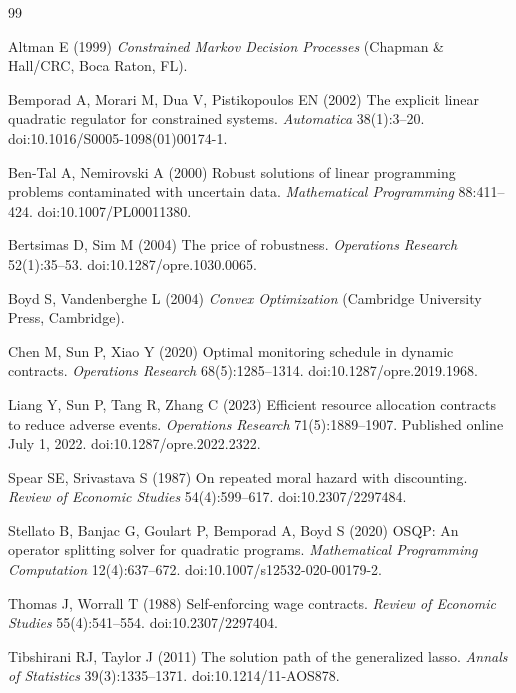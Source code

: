 \begin{thebibliography}{99}\raggedright
{}
Altman E (1999) \emph{Constrained Markov Decision Processes} (Chapman \& Hall/CRC, Boca Raton, FL).

Bemporad A, Morari M, Dua V, Pistikopoulos EN (2002) The explicit linear quadratic regulator for constrained systems. \emph{Automatica} 38(1):3--20. doi:10.1016/S0005-1098(01)00174-1.

Ben-Tal A, Nemirovski A (2000) Robust solutions of linear programming problems contaminated with uncertain data. \emph{Mathematical Programming} 88:411--424. doi:10.1007/PL00011380.

Bertsimas D, Sim M (2004) The price of robustness. \emph{Operations Research} 52(1):35--53. doi:10.1287/opre.1030.0065.

Boyd S, Vandenberghe L (2004) \emph{Convex Optimization} (Cambridge University Press, Cambridge).

Chen M, Sun P, Xiao Y (2020) Optimal monitoring schedule in dynamic contracts. \emph{Operations Research} 68(5):1285--1314. doi:10.1287/opre.2019.1968.

Liang Y, Sun P, Tang R, Zhang C (2023) Efficient resource allocation contracts to reduce adverse events. \emph{Operations Research} 71(5):1889--1907. Published online July 1, 2022. doi:10.1287/opre.2022.2322.

Spear SE, Srivastava S (1987) On repeated moral hazard with discounting. \emph{Review of Economic Studies} 54(4):599--617. doi:10.2307/2297484.

Stellato B, Banjac G, Goulart P, Bemporad A, Boyd S (2020) OSQP: An operator splitting solver for quadratic programs. \emph{Mathematical Programming Computation} 12(4):637--672. doi:10.1007/s12532-020-00179-2.

Thomas J, Worrall T (1988) Self-enforcing wage contracts. \emph{Review of Economic Studies} 55(4):541--554. doi:10.2307/2297404.

Tibshirani RJ, Taylor J (2011) The solution path of the generalized lasso. \emph{Annals of Statistics} 39(3):1335--1371. doi:10.1214/11-AOS878.

\end{thebibliography}
